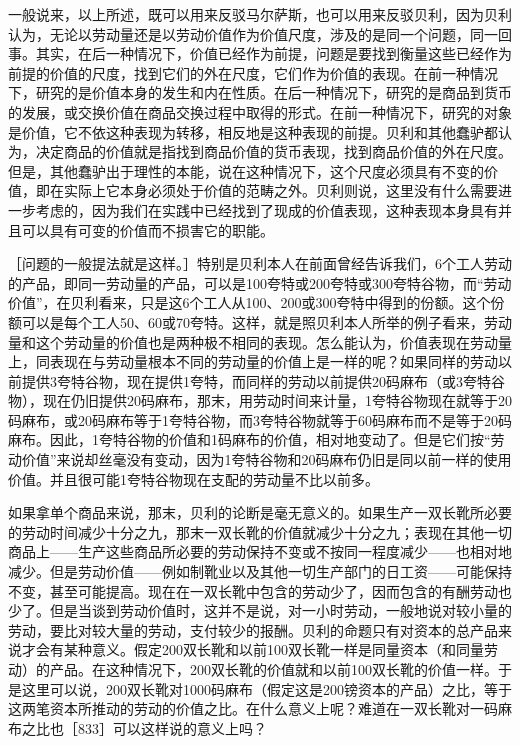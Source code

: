 一般说来，以上所述，既可以用来反驳马尔萨斯，也可以用来反驳贝利，因为贝利认为，无论以劳动量还是以劳动价值作为价值尺度，涉及的是同一个问题，同一回事。其实，在后一种情况下，价值已经作为前提，问题是要找到衡量这些已经作为前提的价值的尺度，找到它们的外在尺度，它们作为价值的表现。在前一种情况下，研究的是价值本身的发生和内在性质。在后一种情况下，研究的是商品到货币的发展，或交换价值在商品交换过程中取得的形式。在前一种情况下，研究的对象是价值，它不依这种表现为转移，相反地是这种表现的前提。贝利和其他蠢驴都认为，决定商品的价值就是指找到商品价值的货币表现，找到商品价值的外在尺度。但是，其他蠢驴出于理性的本能，说在这种情况下，这个尺度必须具有不变的价值，即在实际上它本身必须处于价值的范畴之外。贝利则说，这里没有什么需要进一步考虑的，因为我们在实践中已经找到了现成的价值表现，这种表现本身具有并且可以具有可变的价值而不损害它的职能。

［问题的一般提法就是这样。］特别是贝利本人在前面曾经告诉我们，6个工人劳动的产品，即同一劳动量的产品，可以是100夸特或200夸特或300夸特谷物，而“劳动价值”，在贝利看来，只是这6个工人从100、200或300夸特中得到的份额。这个份额可以是每个工人50、60或70夸特。这样，就是照贝利本人所举的例子看来，劳动量和这个劳动量的价值也是两种极不相同的表现。怎么能认为，价值表现在劳动量上，同表现在与劳动量根本不同的劳动量的价值上是一样的呢？如果同样的劳动以前提供3夸特谷物，现在提供1夸特，而同样的劳动以前提供20码麻布（或3夸特谷物），现在仍旧提供20码麻布，那末，用劳动时间来计量，1夸特谷物现在就等于20码麻布，或20码麻布等于1夸特谷物，而3夸特谷物就等于60码麻布而不是等于20码麻布。因此，1夸特谷物的价值和1码麻布的价值，相对地变动了。但是它们按“劳动价值”来说却丝毫没有变动，因为1夸特谷物和20码麻布仍旧是同以前一样的使用价值。并且很可能1夸特谷物现在支配的劳动量不比以前多。

如果拿单个商品来说，那末，贝利的论断是毫无意义的。如果生产一双长靴所必要的劳动时间减少十分之九，那末一双长靴的价值就减少十分之九；表现在其他一切商品上——生产这些商品所必要的劳动保持不变或不按同一程度减少——也相对地减少。但是劳动价值——例如制靴业以及其他一切生产部门的日工资——可能保持不变，甚至可能提高。现在在一双长靴中包含的劳动少了，因而包含的有酬劳动也少了。但是当谈到劳动价值时，这并不是说，对一小时劳动，一般地说对较小量的劳动，要比对较大量的劳动，支付较少的报酬。贝利的命题只有对资本的总产品来说才会有某种意义。假定200双长靴和以前100双长靴一样是同量资本（和同量劳动）的产品。在这种情况下，200双长靴的价值就和以前100双长靴的价值一样。于是这里可以说，200双长靴对1000码麻布（假定这是200镑资本的产品）之比，等于这两笔资本所推动的劳动的价值之比。在什么意义上呢？难道在一双长靴对一码麻布之比也［833］可以这样说的意义上吗？

